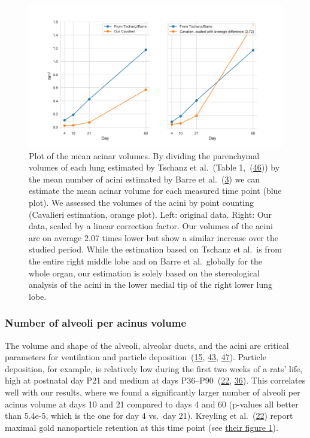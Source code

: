 \documentclass[
  american,
]{article}
\begin{document}
\begin{figure}
\hypertarget{fig:06}{%
\centering
\includegraphics{images/fig06.png}
\caption{Plot of the mean acinar volumes.
By dividing the parenchymal volumes of each lung estimated by Tschanz et al.~(Table 1,~(\protect\hyperlink{ref-wnl86DEM}{46})) by the mean number of acini estimated by Barre et al.~(\protect\hyperlink{ref-uFNlWogb}{3}) we can estimate the mean acinar volume for each measured time point (blue plot).
We assessed the volumes of the acini by point counting (Cavalieri estimation, orange plot).
Left: original data.
Right: Our data, scaled by a linear correction factor.
Our volumes of the acini are on average 2.07 times lower but show a similar increase over the studied period.
While the estimation based on Tschanz et al.~is from the entire right middle lobe and on Barre et al.~globally for the whole organ, our estimation is solely based on the stereological analysis of the acini in the lower medial tip of the right lower lung lobe.}\label{fig:06}
}
\end{figure}

\hypertarget{number-of-alveoli-per-acinus-volume}{%
\subsubsection{Number of alveoli per acinus volume}\label{number-of-alveoli-per-acinus-volume}}

The volume and shape of the alveoli, alveolar ducts, and the acini are critical parameters for ventilation and particle deposition~(\protect\hyperlink{ref-1HOyVjqpM}{15}, \protect\hyperlink{ref-eioib1TQ}{43}, \protect\hyperlink{ref-OT4s1CSX}{47}).
Particle deposition, for example, is relatively low during the first two weeks of a rats' life, high at postnatal day P21 and medium at days P36--P90~(\protect\hyperlink{ref-18DcNLAv6}{22}, \protect\hyperlink{ref-yHHhvOtP}{36}).
This correlates well with our results, where we found a significantly larger number of alveoli per acinus volume at days 10 and 21 compared to days 4 and 60 (p-values all better than 5.4e-5, which is the one for day 4 vs.~day 21).
Kreyling et al.~(\protect\hyperlink{ref-18DcNLAv6}{22}) report maximal gold nanoparticle retention at this time point (see \href{https://pubs.acs.org/doi/10.1021/acsnano.8b01826\#fig1}{their figure 1}).
\end{document}
